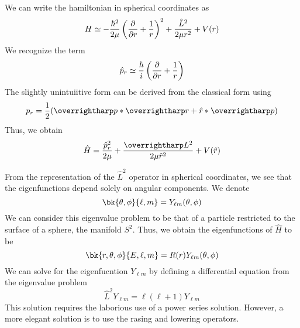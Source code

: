 \begin{aside}
	We can write the hamiltonian in spherical coordinates as
	\[H\simeq -\frac{\hbar^2}{2\mu}\left(\frac{\partial }{\partial r}+\frac{1}{r}\right)^2 + \frac{\hat L^2}{2\mu r^2}+V(r)\]
	We recognize the term
	\[\hat p_r \simeq \frac{\hbar}{i} \left(\frac{\partial }{\partial r}+\frac{1}{r}\right)\]
	The slightly unintuiitive form can be derived from the classical form using
	\[p_r = \frac{1}{2}(\vv p * \vv r + \hat r * \vv p)\]
	Thus, we obtain
	\[\hat H = \frac{\hat p_r^2}{2\mu} + \frac{\vv L^2}{2\mu \hat r^2}+V(\hat r)\]
\end{aside}

From the representation of the \(\hat L^2\) operator in spherical coordinates, we see that the eigenfunctions depend solely on angular components. We denote
\[\bk{\theta, \phi}{\ell, m} = Y_{\ell m}(\theta, \phi)\]
We can consider this eigenvalue problem to be that of a particle restricted to the surface of a sphere, the manifold \(S^2\). Thus, we obtain the eigenfunctions of \(\hat H\) to be
\[\bk{r,\theta,\phi}{E,\ell, m } = R(r)Y_{\ell m}(\theta,\phi)\]
We can solve for the eigenfucntion \(Y_{\ell m}\) by defining a differential equation from the eigenvalue problem
\[\hat L^2 Y_{\ell m} = \ell(\ell+1) Y_{\ell m}\]
This solution requires the laborious use of a power series solution. However, a more elegant solution is to use the rasing and lowering operators. 
